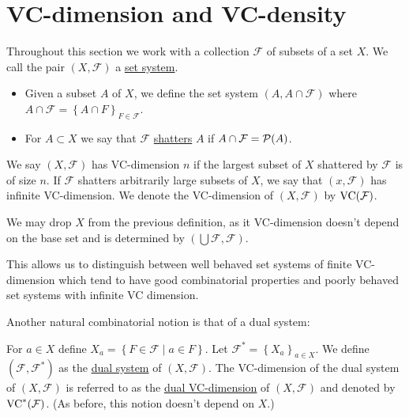 \documentclass{amsart}
\newcommand{\F}{\mathcal F}
\newcommand{\curly}[1]{\left\{#1\right\}}
\newcommand{\defn}{\underline}
\begin{document}

\section{VC-dimension and VC-density}




\begin{Definition}
  Throughout this section we work with a collection $\F$ of subsets of a set $X$.
  We call the pair $(X, \F)$ a \defn{set system}.
  \begin{itemize}
  \item Given a subset $A$ of $X$, we define the set system $(A, A \cap \F)$
    where $A \cap \F = \curly{A \cap F}_{F\in \F}$.
  \item For $A \subset X$ we say that $\F$ \defn{shatters} $A$ if $A \cap \F = \PP(A)$.
  \end{itemize}    
\end{Definition}  

\begin{Definition}
  We say $(X, \F)$ has VC-dimension $n$ if the largest subset of $X$ shattered by $\F$ is of size $n$.
  If $\F$ shatters arbitrarily large subsets of $X$, we say that $(x, \F)$ has infinite VC-dimension.
  We denote the VC-dimension of $(X, \F)$ by $\VC(\F)$.
\end{Definition}  

\begin{Note}
  We may drop $X$ from the previous definition, as it VC-dimension doesn't depend on the base set and is determined by $(\bigcup \F, \F)$.
\end{Note}
This allows us to distinguish between well behaved set systems of finite VC-dimension which tend to have good combinatorial properties and
poorly behaved set systems with infinite VC dimension.

Another natural combinatorial notion is that of a dual system:
\begin{Definition}
  For $a \in X$ define $X_a = \curly{F \in \F \mid a \in F}$.
  Let $\F^* = \curly{X_a}_{a \in X}$.
  We define $(\F, \F^*)$ as the \defn{dual system} of $(X, \F)$.
  The VC-dimension of the dual system of $(X, \F)$ is referred to as the \defn{dual VC-dimension} of $(X, \F)$ and denoted by $\VC^*(\F)$.
  (As before, this notion doesn't depend on $X$.)
\end{Definition}  
\end{document}
